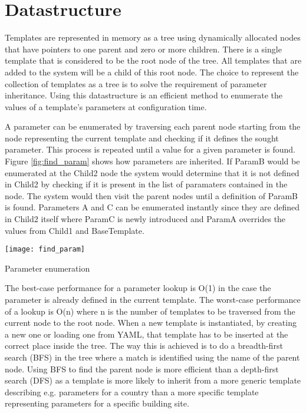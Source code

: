 \section{Datastructure}
Templates are represented in memory as a tree using dynamically allocated nodes that have pointers to one parent and zero or more children.
There is a single template that is considered to be the root node of the tree.
All templates that are added to the system will be a child of this root node.
The choice to represent the collection of templates as a tree is to solve the requirement of parameter inheritance.
Using this datastructure is an efficient method to enumerate the values of a template's parameters at configuration time.

A parameter can be enumerated by traversing each parent node starting from the node representing the current template and checking if it defines the sought parameter.
This process is repeated until a value for a given parameter is found.
Figure \ref{fig:find_param} shows how parameters are inherited.
If ParamB would be enumerated at the Child2 node the system would determine that it is not defined in Child2 by checking if it is present in the list of paramaters contained in the node.
The system would then visit the parent nodes until a definition of ParamB is found.
Parameters A and C can be enumerated instantly since they are defined in Child2 itself where ParamC is newly introduced and ParamA overrides the values from Child1 and BaseTemplate.
\begin{marginfigure}
	\centering
	\texttt{[image: find\_param]}
	\caption{Parameter enumeration}
	\label{fig:find_param}
\end{marginfigure}
The best-case performance for a parameter lookup is O(1) in the case the parameter is already defined in the current template.
The worst-case performance of a lookup is O(n) where n is the number of templates to be traversed from the current node to the root node.
When a new template is instantiated, by creating a new one or loading one from YAML, that template has to be inserted at the correct place inside the tree.
The way this is achieved is to do a breadth-first search (BFS) in the tree where a match is identified using the name of the parent node.
Using BFS to find the parent node is more efficient than a depth-first search (DFS) as a template is more likely to inherit from a more generic template describing e.g. parameters for a country than a more specific template representing parameters for a specific building site. %


